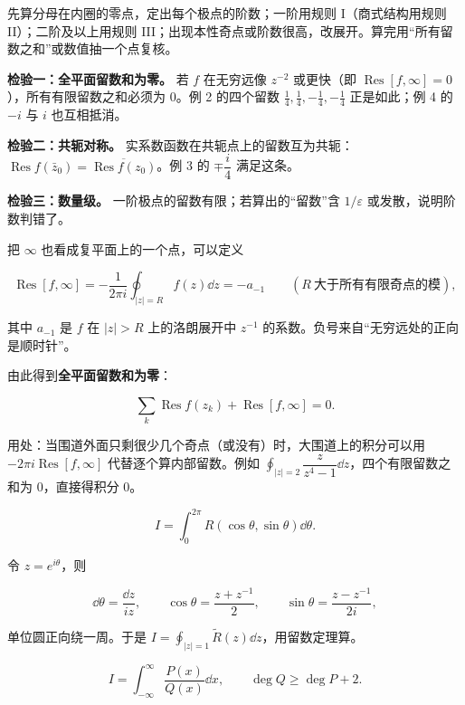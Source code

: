 \documentclass[11pt]{ctexart}
\let\origsubhdr\subhdr
\renewcommand{\subhdr}[1]{\par\needspace{4\baselineskip}\origsubhdr{#1}}
\let\orighdr\hdr
\renewcommand{\hdr}[2]{\par\orighdr{#1}{#2}}
\begin{document}
先算分母在内圈的零点，定出每个极点的阶数；一阶用规则 I（商式结构用规则 II）；二阶及以上用规则 III；出现本性奇点或阶数很高，改展开。算完用“所有留数之和”或数值抽一个点复核。


\textbf{检验一：全平面留数和为零。} 若 $f$ 在无穷远像 $z^{-2}$ 或更快（即 $\operatorname{Res}[f,\infty]=0$），所有有限留数之和必须为 0。例 2 的四个留数 $\frac14,\frac14,-\frac14,-\frac14$ 正是如此；例 4 的 $-i$ 与 $i$ 也互相抵消。

\textbf{检验二：共轭对称。} 实系数函数在共轭点上的留数互为共轭：$\operatorname{Res}f(\bar z_0)=\overline{\operatorname{Res}f(z_0)}$。例 3 的 $\mp\dfrac i4$ 满足这条。

\textbf{检验三：数量级。} 一阶极点的留数有限；若算出的“留数”含 $1/\varepsilon$ 或发散，说明阶数判错了。


把 $\infty$ 也看成复平面上的一个点，可以定义

\[ \operatorname{Res}[f,\infty]=-\frac{1}{2\pi i}\oint_{|z|=R}f(z)\dd z=-a_{-1}\qquad(R\ \text{大于所有有限奇点的模}) , \]

其中 $a_{-1}$ 是 $f$ 在 $|z|>R$ 上的洛朗展开中 $z^{-1}$ 的系数。负号来自“无穷远处的正向是顺时针”。

由此得到\textbf{全平面留数和为零}：

\[ \sum_{k}\operatorname{Res}f(z_k)+\operatorname{Res}[f,\infty]=0 . \]

用处：当围道外面只剩很少几个奇点（或没有）时，大围道上的积分可以用 $-2\pi i\operatorname{Res}[f,\infty]$ 代替逐个算内部留数。例如 $\oint_{|z|=2}\dfrac{z}{z^4-1}\dd z$，四个有限留数之和为 0，直接得积分 0。



\[ I=\int_0^{2\pi}R(\cos\theta,\sin\theta)\dd\theta . \]

令 $z=e^{i\theta}$，则

\[ \dd\theta=\frac{\dd z}{iz},\qquad \cos\theta=\frac{z+z^{-1}}{2},\qquad \sin\theta=\frac{z-z^{-1}}{2i} , \]

单位圆正向绕一周。于是 $I=\oint_{|z|=1}\tilde R(z)\dd z$，用留数定理算。


\[ I=\int_{-\infty}^{\infty}\frac{P(x)}{Q(x)}\dd x,\qquad \deg Q\ge\deg P+2 . \]
\end{document}
